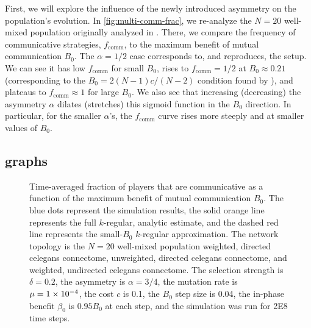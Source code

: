 \documentclass[pdflatex,lineno,referee,sn-mathphys-ay]{sn-jnl}
\begin{document}
First, we will explore the influence of the newly introduced asymmetry
on the population's evolution.
In \cref{fig:multi-comm-frac}, we re-analyze the $N=20$ well-mixed population
originally analyzed in \citet{tripp2022evolutionary}.
There, we compare the frequency of communicative strategies, $f_{\text{comm}}$,
to the maximum benefit of mutual communication $B_0$.
The $\alpha=1/2$ case corresponds to, and reproduces,
the \citet{tripp2022evolutionary} setup.
We can see it has low $f_{\text{comm}}$ for small $B_0$,
rises to $f_{\text{comm}} = 1/2$ at $B_0 \approx 0.21$
(corresponding to the $B_0 = 2 (N-1) c/(N-2)$ condition
found by \citet{tripp2022evolutionary}),
and plateaus to $f_{\text{comm}} \approx 1$ for large $B_0$.
We also see that increasing (decreasing)
the asymmetry $\alpha$ dilates (stretches) this sigmoid function
in the $B_0$ direction.
In particular, for the smaller $\alpha$'s, the $f_{\text{comm}}$ curve
rises more steeply and at smaller values of $B_0$.

\subsection{ graphs}
\label{sec:elegans_graph}

\begin{figure}
  \centering
  
  \caption{
    Time-averaged fraction of players that are communicative as a function
    of the maximum benefit of mutual communication $B_0$.
    The blue dots represent the simulation results,
    the solid orange line represents the full $k$-regular, analytic estimate,
    and the dashed red line represents the small-$B_0$ $k$-regular approximation.
    The network topology is the
    $N=20$ well-mixed population
    weighted, directed \gls{celegans} connectome,
    unweighted, directed \gls{celegans} connectome,
    and
    weighted, undirected \gls{celegans} connectome.
    The selection strength is $\delta=0.2$,
    the asymmetry is $\alpha=3/4$,
    the mutation rate is $\mu=\num{1E-4}$,
    the cost $c$ is \num{0.1},
    the $B_0$ step size is \num{0.04},
    the in-phase benefit $\beta_0$ is $\num{0.95} B_0$ at each step,
    and the simulation was run for \num{2E8} time steps.
  }
  \label{fig:comm-frac}
\end{figure}
\end{document}
